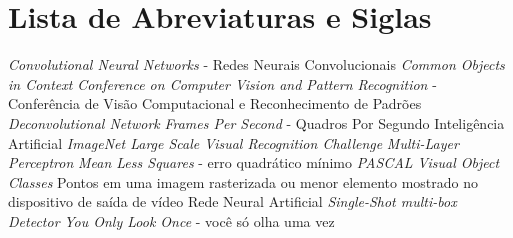 \chapter*{Lista de Abreviaturas e Siglas}


\begin{acronym}
 {\textit{Convolutional Neural Networks} - Redes Neurais Convolucionais}
 {\textit{Common Objects in Context}}
 {\textit{Conference on Computer Vision and Pattern Recognition} - Conferência de Visão Computacional e Reconhecimento de Padrões}
 {\textit{Deconvolutional Network}}
 {\textit{Frames Per Second} - Quadros Por Segundo}
 {Inteligência Artificial}
 {\textit{ImageNet Large Scale Visual Recognition Challenge}}
 {\textit{Multi-Layer Perceptron}}
 {\textit{Mean Less Squares} - erro quadrático mínimo}
 {\textit{PASCAL Visual Object Classes}}
 {Pontos em uma imagem rasterizada ou menor elemento mostrado no dispositivo de saída de vídeo}
 {Rede Neural Artificial}
 {\textit{Single-Shot multi-box Detector}}
 {\textit{You Only Look Once} - você só olha uma vez}
\end{acronym}
